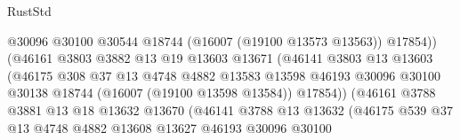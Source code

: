 \begin{lexlean}{RustStd}
\begin{coremodule}
                                        @30096
                                        @30100
                                        @30544
                                        @18744
                                        (@16007 (@19100 @13573 @13563))
                                        @17854))
                                    (@46161
                                      @3803
                                      @3882
                                      @13
                                      @19
                                      @13603
                                      @13671
                                      (@46141
                                        @3803
                                        @13
                                        @13603
                                        (@46175
                                          @308
                                          @37
                                          @13
                                          @4748
                                          @4882
                                          @13583
                                          @13598
                                          @46193
                                          @30096
                                          @30100
                                          @30138
                                          @18744
                                          (@16007 (@19100 @13598 @13584))
                                          @17854))
                                      (@46161
                                        @3788
                                        @3881
                                        @13
                                        @18
                                        @13632
                                        @13670
                                        (@46141
                                          @3788
                                          @13
                                          @13632
                                          (@46175
                                            @539
                                            @37
                                            @13
                                            @4748
                                            @4882
                                            @13608
                                            @13627
                                            @46193
                                            @30096
                                            @30100

\end{coremodule}
\end{lexlean}
